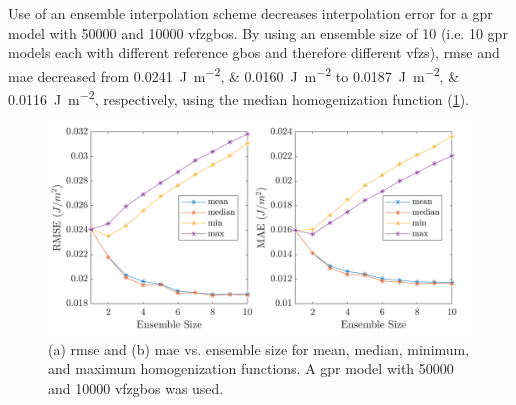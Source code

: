 \documentclass[preprint,12pt]{elsarticle}
\begin{document}
	Use of an ensemble interpolation scheme decreases interpolation error for a \gls{gpr} model with \num{50000} \inpt{} and \num{10000} \outpt{} \glspl{vfzgbo}. By using an ensemble size of 10 (i.e. 10 \gls{gpr} models each with different reference \glspl{gbo} and therefore different \glspl{vfz}), \gls{rmse} and \gls{mae} decreased from \SIlist{0.0241;0.0160}{\J\per\square\m} to \SIlist{0.0187;0.0116}{\J\per\square\m}, respectively, using the median homogenization function (\cref{fig:ensemble-interp-rmse-mae}). 
	\begin{figure}
		\centering
		\includegraphics[scale=1]{figures/ensemble-interp-rmse-mae.png}
		\caption{(a) \Gls{rmse} and (b) \gls{mae} vs. ensemble size for mean, median, minimum, and maximum homogenization functions. A \gls{gpr} model with \num{50000} \inpt{} and \num{10000} \outpt{} \glspl{vfzgbo} was used. }
		\label{fig:ensemble-interp-rmse-mae}
	\end{figure}
	
\end{document}
